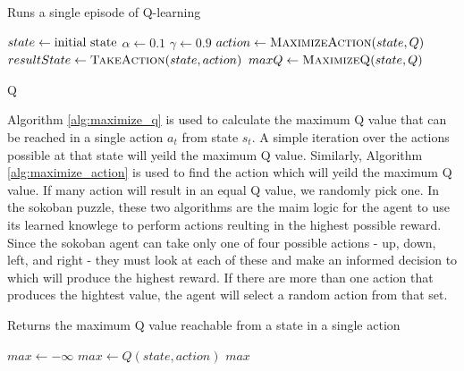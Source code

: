 \documentclass[times, 10pt,twocolumn]{article}
\begin{document}
\begin{algorithm}
  \caption{Runs a single episode of Q-learning}
  \begin{algorithmic}[1]
      \State $state\gets \textnormal{initial state}$
      \State $\alpha \gets 0.1$ 
      \State $\gamma \gets 0.9$ 
        \State $action\gets \Call{MaximizeAction}{state, Q}$
        \State $resultState\gets \Call{TakeAction}{state, action}$
        \State $maxQ\gets \Call{MaximizeQ}{state, Q}$
        \State {}
      \EndWhile
      \State \Return Q
    \EndFunction
  \end{algorithmic}
  \label{alg:run_episode}
\end{algorithm}

Algorithm \ref{alg:maximize_q} is used to calculate the maximum Q value that can be reached in a single action $a_t$ from state $s_t$.  A simple iteration over the actions possible at that state will yeild the maximum Q value.  Similarly, Algorithm \ref{alg:maximize_action} is used to find the action which will yeild the maximum Q value.  If many action will result in an equal Q value, we randomly pick one.  In the sokoban puzzle, these two algorithms are the maim logic for the agent to use its learned knowlege to perform actions reulting in the highest possible reward.  Since the sokoban agent can take only one of four possible actions - up, down, left, and right - they must look at each of these and make an informed decision to which will produce the highest reward.  If there are more than one action that produces the hightest value, the agent will select a random action from that set.

\begin{algorithm}
  \caption{Returns the maximum Q value reachable from a state in a single action}
  \begin{algorithmic}[4]
      \State $max\gets -\infty$
          \State $max\gets Q(state, action)$
        \EndIf
      \EndFor
      \State \Return $max$
    \EndFunction
  \end{algorithmic}
  \label{alg:maximize_q}
\end{algorithm}
\end{document}
